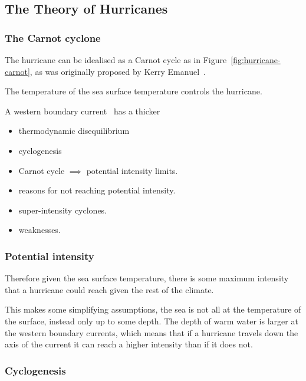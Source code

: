 
\subsection{The Theory of Hurricanes}
\label{sec:hurr-theory}
\subsubsection{The Carnot cyclone}
\label{sec:carnot}

The hurricane can be idealised as a Carnot cycle as in Figure~\ref{fig:hurricane-carnot},
as was originally proposed by Kerry Emanuel~\cite{lilly1985steady, emanuel1986air,emanuel1987dependence}.
\cite{emanuel2018progress}



The temperature of the sea surface temperature controls the hurricane.

A western boundary current~\cite{hogg1995western} has a thicker

\begin{itemize}
\item thermodynamic disequilibrium
\item cyclogenesis
\item Carnot cycle $\implies$ potential intensity limits.
\item reasons for not reaching potential intensity.
\item super-intensity cyclones.
\item weaknesses.
\end{itemize}

\subsubsection{Potential intensity}
\label{sec:potential_intensity}

Therefore given the sea surface temperature, there is some maximum intensity
that a hurricane could reach given the rest of the climate.


\cite{bister1996development,bister1998dissipative}

This makes some simplifying assumptions, the sea is not all at the temperature
of the surface, instead only up to some depth. The depth of warm water
is larger at the western boundary currents, which means that if a hurricane
travels down the axis of the current it can reach a higher intensity than
if it does not.

\subsubsection{Cyclogenesis}

